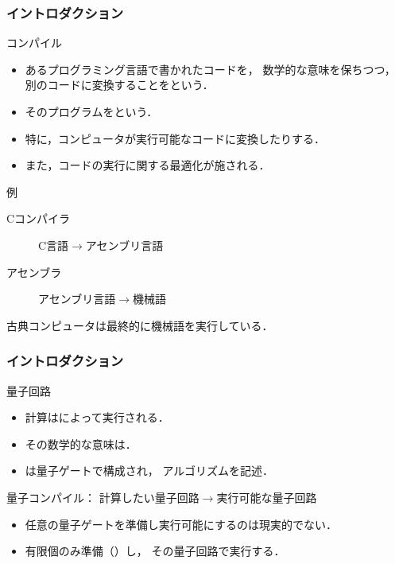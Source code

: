 \documentclass{beamer} %
\newcommand{\0}{\mathbf{0}}
\newcommand{\1}{\mathbf{1}}
\newcommand{\2}{\mathbf{2}}
\begin{document}
\begin{frame}
  \frametitle{イントロダクション}
  \begin{block}{コンパイル}
    \begin{itemize}
      \item あるプログラミング言語で書かれたコードを，
            数学的な意味を保ちつつ，
            別のコードに変換することをという．
      \item そのプログラムをという．
      \item 特に，コンピュータが実行可能なコードに変換したりする．
      \item また，コードの実行に関する最適化が施される．
    \end{itemize}
  \end{block}

  \begin{exampleblock}{例}
    \begin{description}
      \item[Cコンパイラ] C言語\(\to\)アセンブリ言語
      \item[アセンブラ] アセンブリ言語\(\to\)機械語
    \end{description}
    古典コンピュータは最終的に機械語を実行している．
  \end{exampleblock}
\end{frame}

\begin{frame}
  \frametitle{イントロダクション}
  \begin{block}{量子回路}
    \begin{itemize}
      \item 計算はによって実行される．
      \item その数学的な意味は．
      \item {}は量子ゲートで構成され，
            アルゴリズムを記述．
    \end{itemize}
  \end{block}

  \begin{block}{量子コンパイル：
      計算したい量子回路\(\to\)実行可能な量子回路}
    \begin{itemize}
      \item 任意の量子ゲートを準備し実行可能にするのは現実的でない．
      \item 有限個のみ準備（）し，
            その量子回路で実行する．
    \end{itemize}
  \end{block}
\end{frame}
\end{document}
